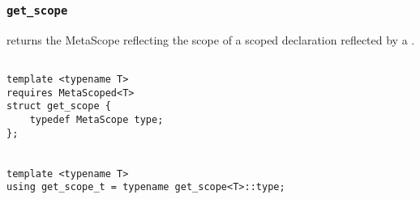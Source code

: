 
\subsubsection{\texttt{get\_scope}}

returns the MetaScope reflecting the scope of a scoped declaration reflected by a .

\begin{verbatim}

template <typename T>
requires MetaScoped<T>
struct get_scope {
	typedef MetaScope type;
};


template <typename T>
using get_scope_t = typename get_scope<T>::type;

\end{verbatim}
